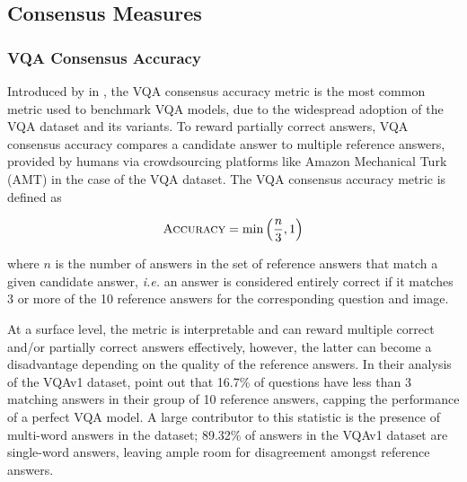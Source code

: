 


\subsection{Consensus Measures}
\label{subsection:consensus_measures}

\subsubsection{VQA Consensus Accuracy}
Introduced by \citeauthor{antol2015vqa} in \citeyear{antol2015vqa}, the VQA consensus accuracy metric is the most common metric used to benchmark VQA models, due to the widespread adoption of the VQA dataset and its variants. To reward partially correct answers, VQA consensus accuracy compares a candidate answer to multiple reference answers, provided by humans via crowdsourcing platforms like Amazon Mechanical Turk (AMT) in the case of the VQA dataset. The VQA consensus accuracy metric is defined as

\begin{equation}
    \textsc{Accuracy} = \min \left( \frac{n}{3}, 1 \right)
    \label{equation:vqa_consensus_accuracy}
\end{equation}

where \(n\) is the number of answers in the set of reference answers that match a given candidate answer, \textit{i.e.} an answer is considered entirely correct if it matches 3 or more of the 10 reference answers for the corresponding question and image.

At a surface level, the metric is interpretable and can reward multiple correct and/or partially correct answers effectively, however, the latter can become a disadvantage depending on the quality of the reference answers. In their analysis of the VQAv1 dataset, \citeauthor{kafle2017visual} point out that 16.7\% of questions have less than 3 matching answers in their group of 10 reference answers, capping the performance of a perfect VQA model. A large contributor to this statistic is the presence of multi-word answers in the dataset; 89.32\% of answers in the VQAv1 dataset are single-word answers, leaving ample room for disagreement amongst reference answers.

